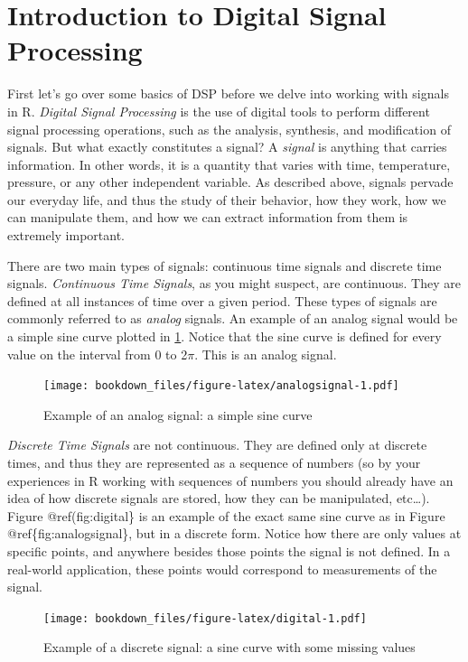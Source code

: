 \documentclass[]{krantz}
\begin{document}
\section{Introduction to Digital Signal
Processing}\label{introduction-to-digital-signal-processing}

First let's go over some basics of DSP before we delve into working with
signals in R. \emph{Digital Signal Processing} is the use of digital
tools to perform different signal processing operations, such as the
analysis, synthesis, and modification of signals. But what exactly
constitutes a signal? A \emph{signal} is anything that carries
information. In other words, it is a quantity that varies with time,
temperature, pressure, or any other independent variable. As described
above, signals pervade our everyday life, and thus the study of their
behavior, how they work, how we can manipulate them, and how we can
extract information from them is extremely important.

There are two main types of signals: continuous time signals and
discrete time signals. \emph{Continuous Time Signals}, as you might
suspect, are continuous. They are defined at all instances of time over
a given period. These types of signals are commonly referred to as
\emph{analog} signals. An example of an analog signal would be a simple
sine curve plotted in \ref{fig:analogsignal}. Notice that the sine curve
is defined for every value on the interval from 0 to 2\(\pi\). This is
an analog signal.

\begin{figure}
\centering
\texttt{[image: bookdown\_files/figure-latex/analogsignal-1.pdf]}
\caption{\label{fig:analogsignal}Example of an analog signal: a simple sine
curve}
\end{figure}

\emph{Discrete Time Signals} are not continuous. They are defined only
at discrete times, and thus they are represented as a sequence of
numbers (so by your experiences in R working with sequences of numbers
you should already have an idea of how discrete signals are stored, how
they can be manipulated, etc\ldots{}). Figure @ref(fig:digital\} is an
example of the exact same sine curve as in Figure
@ref\{fig:analogsignal\}, but in a discrete form. Notice how there are
only values at specific points, and anywhere besides those points the
signal is not defined. In a real-world application, these points would
correspond to measurements of the signal.

\begin{figure}
\centering
\texttt{[image: bookdown\_files/figure-latex/digital-1.pdf]}
\caption{\label{fig:digital}Example of a discrete signal: a sine curve with
some missing values}
\end{figure}
\end{document}
